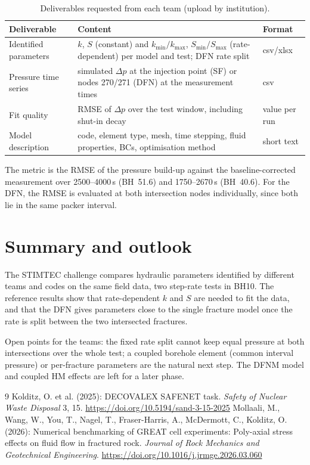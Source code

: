 \documentclass[11pt,a4paper]{article}
\begin{document}
\begin{table}[H]
  \centering
  \caption{Deliverables requested from each team (upload by institution).}
  \begin{tabularx}{\textwidth}{lXl}
    \toprule
    Deliverable & Content & Format \\
    \midrule
    Identified parameters & $k$, $S$ (constant) and $k_{\min}/k_{\max}$, $S_{\min}/S_{\max}$ (rate-dependent) per model and test; DFN rate split & csv/xlsx \\
    Pressure time series & simulated $\Delta p$ at the injection point (SF) or nodes 270/271 (DFN) at the measurement times & csv \\
    Fit quality & RMSE of $\Delta p$ over the test window, including shut-in decay & value per run \\
    Model description & code, element type, mesh, time stepping, fluid properties, BCs, optimisation method & short text \\
    \bottomrule
  \end{tabularx}
\end{table}

The metric is the RMSE of the pressure build-up against the baseline-corrected measurement over 2500--4000\,s (BH~51.6) and 1750--2670\,s (BH~40.6). For the DFN, the RMSE is evaluated at both intersection nodes individually, since both lie in the same packer interval.

\section{Summary and outlook}

The STIMTEC challenge compares hydraulic parameters identified by different teams and codes on the same field data, two step-rate tests in BH10. The reference results show that rate-dependent $k$ and $S$ are needed to fit the data, and that the DFN gives parameters close to the single fracture model once the rate is split between the two intersected fractures.

Open points for the teams: the fixed rate split cannot keep equal pressure at both intersections over the whole test; a coupled borehole element (common interval pressure) or per-fracture parameters are the natural next step. The DFNM model and coupled HM effects are left for a later phase.

\begin{thebibliography}{9}
 Kolditz, O. et al. (2025): DECOVALEX SAFENET task. \emph{Safety of Nuclear Waste Disposal} 3, 15. \url{https://doi.org/10.5194/sand-3-15-2025}
 Mollaali, M., Wang, W., You, T., Nagel, T., Fraser-Harris, A., McDermott, C., Kolditz, O. (2026): Numerical benchmarking of GREAT cell experiments: Poly-axial stress effects on fluid flow in fractured rock. \emph{Journal of Rock Mechanics and Geotechnical Engineering}. \url{https://doi.org/10.1016/j.jrmge.2026.03.060}
\end{thebibliography}
\end{document}
